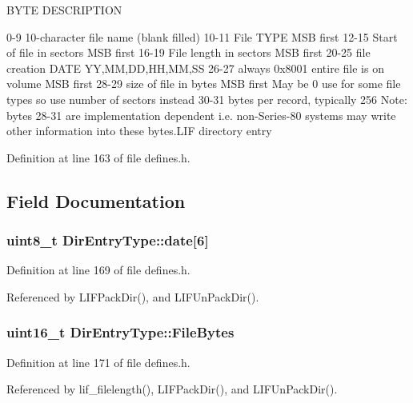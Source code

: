B\+Y\+TE D\+E\+S\+C\+R\+I\+P\+T\+I\+ON 

 0-\/9 10-\/character file name (blank filled) 10-\/11 File T\+Y\+PE M\+SB first 12-\/15 Start of file in sectors M\+SB first 16-\/19 File length in sectors M\+SB first 20-\/25 file creation D\+A\+TE YY,MM,DD,HH,MM,SS 26-\/27 always 0x8001 entire file is on volume M\+SB first 28-\/29 size of file in bytes M\+SB first May be 0 use for some file types so use number of sectors instead 30-\/31 bytes per record, typically 256 Note\+: bytes 28-\/31 are implementation dependent i.\+e. non-\/\+Series-\/80 systems may write other information into these bytes.\+L\+IF directory entry 

Definition at line 163 of file defines.\+h.



\subsection{Field Documentation}
\subsubsection[{\texorpdfstring{date}{date}}]{\setlength{\rightskip}{0pt plus 5cm}uint8\+\_\+t Dir\+Entry\+Type\+::date\mbox{[}6\mbox{]}}\hypertarget{structDirEntryType_a1850264d3e4eac53b665a702ac7000fd}{}\label{structDirEntryType_a1850264d3e4eac53b665a702ac7000fd}


Definition at line 169 of file defines.\+h.



Referenced by L\+I\+F\+Pack\+Dir(), and L\+I\+F\+Un\+Pack\+Dir().

\subsubsection[{\texorpdfstring{File\+Bytes}{FileBytes}}]{\setlength{\rightskip}{0pt plus 5cm}uint16\+\_\+t Dir\+Entry\+Type\+::\+File\+Bytes}\hypertarget{structDirEntryType_a3251ab2e011f1c428b051cb4d974a529}{}\label{structDirEntryType_a3251ab2e011f1c428b051cb4d974a529}


Definition at line 171 of file defines.\+h.



Referenced by lif\+\_\+filelength(), L\+I\+F\+Pack\+Dir(), and L\+I\+F\+Un\+Pack\+Dir().

